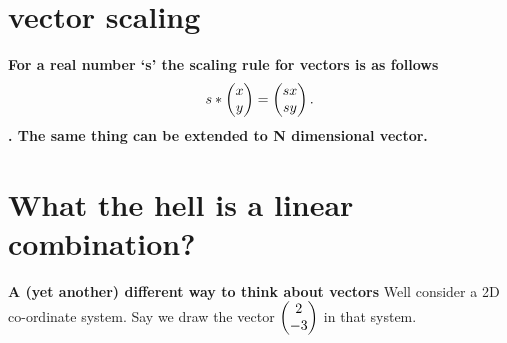 \documentclass[../main.tex]{subfiles}
\begin{document}
\section{vector scaling}

\begin{definition}
  \label{def:vector_scaling}

  \textbf{For a real number `s' the scaling rule for vectors is as follows \[
s * \blockcomment{Column-Vector: x, y} \begin{pmatrix} x \\  y \end{pmatrix} = \blockcomment{Column-Vector: sx, sy} \begin{pmatrix} sx \\  sy \end{pmatrix}
.\]. The same thing can be extended to N dimensional vector.}


\end{definition}
\pagebreak

\section{What the hell is a linear combination?}

\textbf{A (yet another) different way to think about vectors}
Well consider a 2D co-ordinate system. Say we draw the vector $ \blockcomment{Column-Vector: 2, -3} \begin{pmatrix} 2 \\  -3 \end{pmatrix} $ in that system.

\begin{figure}[h]
  \centering
\end{figure}
\end{document}
